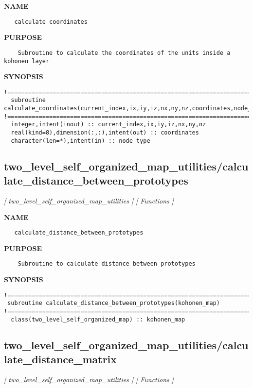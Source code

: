 \documentclass{article}
\begin{document}
\label{ch:robo63}
\label{ch:two_level_self_organized_map_utilities_calculate_coordinates}
\textbf{NAME}
\begin{verbatim}
   calculate_coordinates
\end{verbatim}
\textbf{PURPOSE}
\begin{verbatim}
    Subroutine to calculate the coordinates of the units inside a kohonen layer 
\end{verbatim}
\textbf{SYNOPSIS}
\begin{verbatim}
!========================================================================================
  subroutine calculate_coordinates(current_index,ix,iy,iz,nx,ny,nz,coordinates,node_type)
!========================================================================================
  integer,intent(inout) :: current_index,ix,iy,iz,nx,ny,nz
  real(kind=8),dimension(:,:),intent(out) :: coordinates
  character(len=*),intent(in) :: node_type
\end{verbatim}
\newpage
\subsection{two\_level\_self\_organized\_map\_utilities/calculate\_distance\_between\_prototypes}
\textsl{[ two\_level\_self\_organized\_map\_utilities ]}
\textsl{[ Functions ]}

\label{ch:robo64}
\label{ch:two_level_self_organized_map_utilities_calculate_distance_between_prototypes}
\textbf{NAME}
\begin{verbatim}
   calculate_distance_between_prototypes
\end{verbatim}
\textbf{PURPOSE}
\begin{verbatim}
    Subroutine to calculate distance between prototypes
\end{verbatim}
\textbf{SYNOPSIS}
\begin{verbatim}
!========================================================================================
 subroutine calculate_distance_between_prototypes(kohonen_map)
!========================================================================================
  class(two_level_self_organized_map) :: kohonen_map
\end{verbatim}
\newpage
\subsection{two\_level\_self\_organized\_map\_utilities/calculate\_distance\_matrix}
\textsl{[ two\_level\_self\_organized\_map\_utilities ]}
\textsl{[ Functions ]}
\end{document}
